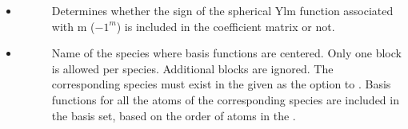 \documentclass[letterpaper,10pt,english]{sphinxmanual}
\begin{document}
\begin{itemize}
\begin{description}
\end{description}

\item {} \begin{description}
\item[{}] \leavevmode
Determines whether the sign of the spherical Ylm function associated with m (\(-1^{m}\)) is included in the coefficient matrix or not.

\end{description}

\item {} \begin{description}
\item[{}] \leavevmode
Name of the species where basis functions are centered. Only one  block is allowed per species. Additional blocks are ignored. The corresponding species must exist in the  given as the  option to . Basis functions for all the atoms of the corresponding species are included in the basis set, based on the order of atoms in the .

\end{description}

\end{itemize}
\end{document}
